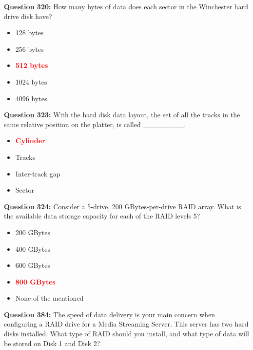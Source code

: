 \documentclass[12pt,a4paper]{article}
\begin{document}
\vspace{0.5cm}

\textbf{Question 320:} How many bytes of data does each sector in the Winchester hard drive disk have?

\begin{itemize}
    \item[\textbf{A.}] 128 bytes
    \item[\textbf{B.}] 256 bytes
    \item[\textbf{C.}] \textcolor{red}{\textbf{512 bytes}}
    \item[\textbf{D.}] 1024 bytes
    \item[\textbf{E.}] 4096 bytes
\end{itemize}

\vspace{0.5cm}

\textbf{Question 323:} With the hard disk data layout, the set of all the tracks in the same relative position on the platter, is called ________.

\begin{itemize}
    \item[\textbf{A.}] \textcolor{red}{\textbf{Cylinder}}
    \item[\textbf{B.}] Tracks
    \item[\textbf{C.}] Inter-track gap
    \item[\textbf{D.}] Sector
\end{itemize}

\vspace{0.5cm}

\textbf{Question 324:} Consider a 5-drive, 200 GBytes-per-drive RAID array. What is the available data storage capacity for each of the RAID levels 5?

\begin{itemize}
    \item[\textbf{A.}] 200 GBytes
    \item[\textbf{B.}] 400 GBytes
    \item[\textbf{C.}] 600 GBytes
    \item[\textbf{D.}] \textcolor{red}{\textbf{800 GBytes}}
    \item[\textbf{E.}] None of the mentioned
\end{itemize}

\vspace{0.5cm}

\textbf{Question 384:} The speed of data delivery is your main concern when configuring a RAID drive for a Media Streaming Server. This server has two hard disks installed. What type of RAID should you install, and what type of data will be stored on Disk 1 and Disk 2?
\end{document}
